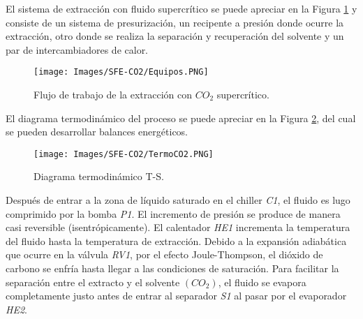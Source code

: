 \noindent
\justify

El sistema de extracci\'on con fluido supercr\'itico se puede apreciar en la Figura \ref{co2} y consiste de un sistema de presurizaci\'on, un recipente a presi\'on donde ocurre la extracci\'on, otro donde se realiza la separaci\'on y recuperaci\'on del solvente y un par de intercambiadores de calor.

\begin{figure}[h!]
	\centering
	\texttt{[image: Images/SFE-CO2/Equipos.PNG]}
	\caption{Flujo de trabajo de la extracci\'on con $CO_2$ supercr\'itico.}
	\label{co2}
\end{figure}

\noindent
\justify

El diagrama termodin\'amico del proceso se puede apreciar en la Figura \ref{termo}, del cual se pueden desarrollar balances energ\'eticos.

\begin{figure}[h!]
	\centering
	\texttt{[image: Images/SFE-CO2/TermoCO2.PNG]}
	\caption{Diagrama termodin\'amico T-S.}
	\label{termo}
\end{figure}

\noindent
\justify

Despu\'es de entrar a la zona de l\'iquido saturado en el chiller \textit{C1}, el fluido es lugo comprimido por la bomba \textit{P1}. El incremento de presi\'on se produce de manera casi reversible (isentr\'opicamente). El calentador \textit{HE1} incrementa la temperatura del fluido hasta la temperatura de extracci\'on. Debido a la expansi\'on adiab\'atica que ocurre en la v\'alvula \textit{RV1}, por el efecto Joule-Thompson, el di\'oxido de carbono se enfr\'ia hasta llegar a las condiciones de saturaci\'on. Para facilitar la separaci\'on entre el extracto y el solvente $\left(CO_2 \right)$, el fluido se evapora completamente justo antes de entrar al separador \textit{S1} al pasar por el evaporador \textit{HE2}.

